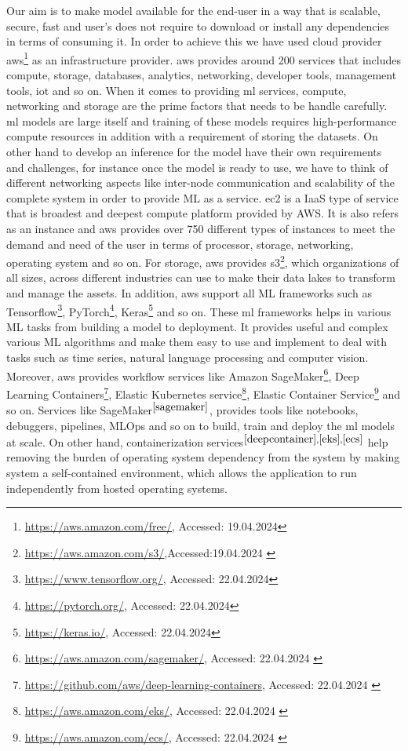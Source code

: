 Our aim is to make model available for the end-user in a way that is scalable, secure, fast and user's does not require to download or install any dependencies in terms of consuming it. In order to achieve this we have used cloud provider \acrfull{aws}\footnote{\url{https://aws.amazon.com/free/}, Accessed: 19.04.2024} as an infrastructure provider. \acrshort{aws} provides around 200 services that includes compute, storage, databases, analytics, networking, developer tools, management tools, \acrshort{iot} and so on. When it comes to providing \acrshort{ml} services, compute, networking and storage are the prime factors that needs to be handle carefully. \acrshort{ml} models are large itself and training of these models requires high-performance compute resources in addition with a requirement of storing the datasets. On other hand to develop an inference for the model have their own requirements and challenges, for instance once the model is ready to use, we have to think of different networking aspects like inter-node communication and scalability of the complete system in order to provide ML as a service. \acrshort{ec2} is a IaaS type of service that is broadest and deepest compute platform provided by AWS. It is also refers as an instance and \acrshort{aws} provides over 750 different types of instances to meet the demand and need of the user in terms of processor, storage, networking, operating system and so on. For storage, \acrshort{aws} provides \acrfull{s3}\footnote{\url{https://aws.amazon.com/s3/},Accessed:19.04.2024 \label{s3}}, which organizations of all sizes, across different industries can use to make their data lakes to transform and manage the assets. In addition, \acrshort{aws} support all ML frameworks such as Tensorflow\footnote{\url{https://www.tensorflow.org/}, Accessed: 22.04.2024}, PyTorch\footnote{\url{https://pytorch.org/}, Accessed: 22.04.2024}, Keras\footnote{\url{https://keras.io/}, Accessed: 22.04.2024} and so on. These \acrshort{ml} frameworks helps in various ML tasks from building a model to deployment. It provides useful and complex various ML  algorithms and make them easy to use and implement to deal with tasks such as time series, natural language processing and computer vision. Moreover, \acrshort{aws} provides workflow services like Amazon SageMaker\footnote{\url{https://aws.amazon.com/sagemaker/}, Accessed: 22.04.2024 \label{sagemaker}}, Deep Learning Containers\footnote{\url{https://github.com/aws/deep-learning-containers}, Accessed: 22.04.2024 \label{deepcontainer}}, Elastic Kubernetes service\footnote{\url{https://aws.amazon.com/eks/}, Accessed: 22.04.2024 \label{eks}}, Elastic Container Service\footnote{\url{https://aws.amazon.com/ecs/}, Accessed: 22.04.2024 \label{ecs}} and so on. Services like SageMaker\(^{\ref{sagemaker}}\), provides tools like notebooks, debuggers, pipelines, MLOps and so on to build, train and deploy the \acrshort{ml} models at scale. On other hand,  containerization services\(^{\ref{deepcontainer}, \ref{eks}, \ref{ecs}}\) help removing the burden of operating system dependency from the system by making system a self-contained environment, which allows the application to run independently from hosted operating systems. 

